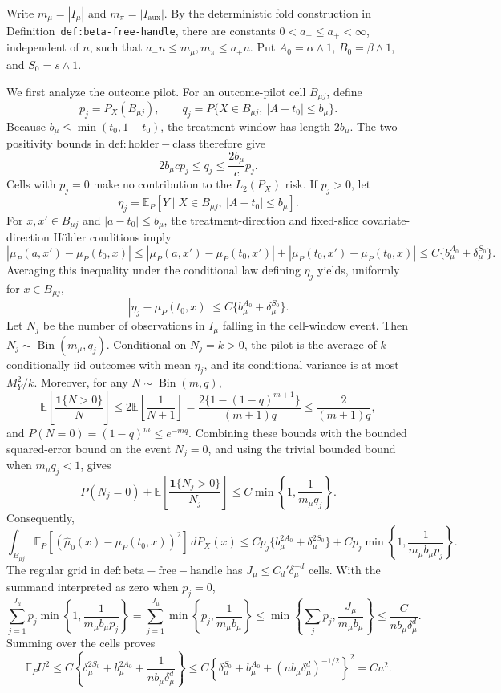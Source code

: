 Write \(m_\mu=|I_\mu|\) and \(m_\pi=|I_{\mathrm{aux}}|\). By the deterministic fold construction in Definition~\texttt{def:beta-free-handle}, there are constants \(0<a_-\le a_+<\infty\), independent of \(n\), such that \(a_-n\le m_\mu,m_\pi\le a_+n\). Put \(A_0=\alpha\wedge1\), \(B_0=\beta\wedge1\), and \(S_0=s\wedge1\).

We first analyze the outcome pilot. For an outcome-pilot cell \(B_{\mu j}\), define
\[
p_j=P_X(B_{\mu j}),\qquad q_j=P\{X\in B_{\mu j},\ |A-t_0|\le b_\mu\}.
\]
Because \(b_\mu\le\min(t_0,1-t_0)\), the treatment window has length \(2b_\mu\). The two positivity bounds in \(\mathrm{def:holder-class}\) therefore give
\[
2b_\mu c p_j\le q_j\le \frac{2b_\mu}{c}p_j.
\]
Cells with \(p_j=0\) make no contribution to the \(L_2(P_X)\) risk. If \(p_j>0\), let
\[
\eta_j=\mathbb E_P[Y\mid X\in B_{\mu j},\ |A-t_0|\le b_\mu].
\]
For \(x,x'\in B_{\mu j}\) and \(|a-t_0|\le b_\mu\), the treatment-direction and fixed-slice covariate-direction Hölder conditions imply
\[
|\mu_P(a,x')-\mu_P(t_0,x)|
\le |\mu_P(a,x')-\mu_P(t_0,x')|
   +|\mu_P(t_0,x')-\mu_P(t_0,x)|
\le C\{b_\mu^{A_0}+\delta_\mu^{S_0}\}.
\]
Averaging this inequality under the conditional law defining \(\eta_j\) yields, uniformly for \(x\in B_{\mu j}\),
\[
|\eta_j-\mu_P(t_0,x)|\le C\{b_\mu^{A_0}+\delta_\mu^{S_0}\}.
\]
Let \(N_j\) be the number of observations in \(I_\mu\) falling in the cell-window event. Then \(N_j\sim\operatorname{Bin}(m_\mu,q_j)\). Conditional on \(N_j=k>0\), the pilot is the average of \(k\) conditionally iid outcomes with mean \(\eta_j\), and its conditional variance is at most \(M_Y^2/k\). Moreover, for any \(N\sim\operatorname{Bin}(m,q)\),
\[
\mathbb E\!\left[\frac{\mathbf 1\{N>0\}}{N}\right]
\le 2\mathbb E\!\left[\frac1{N+1}\right]
=\frac{2\{1-(1-q)^{m+1}\}}{(m+1)q}
\le\frac{2}{(m+1)q},
\]
and \(P(N=0)=(1-q)^m\le e^{-mq}\). Combining these bounds with the bounded squared-error bound on the event \(N_j=0\), and using the trivial bounded bound when \(m_\mu q_j<1\), gives
\[
P(N_j=0)+\mathbb E\!\left[\frac{\mathbf 1\{N_j>0\}}{N_j}\right]
\le C\min\left\{1,\frac1{m_\mu q_j}\right\}.
\]
Consequently,
\[
\int_{B_{\mu j}}\mathbb E_P[(\widehat\mu_0(x)-\mu_P(t_0,x))^2]\,dP_X(x)
\le Cp_j\{b_\mu^{2A_0}+\delta_\mu^{2S_0}\}
 +Cp_j\min\left\{1,\frac1{m_\mu b_\mu p_j}\right\}.
\]
The regular grid in \(\mathrm{def:beta-free-handle}\) has \(J_\mu\le C_d'\delta_\mu^{-d}\) cells. With the summand interpreted as zero when \(p_j=0\),
\[
\sum_{j=1}^{J_\mu}p_j\min\left\{1,\frac1{m_\mu b_\mu p_j}\right\}
=
\sum_{j=1}^{J_\mu}\min\left\{p_j,\frac1{m_\mu b_\mu}\right\}
\le \min\left\{\sum_jp_j,\frac{J_\mu}{m_\mu b_\mu}\right\}
\le \frac{C}{nb_\mu\delta_\mu^d}.
\]
Summing over the cells proves
\[
\mathbb E_PU^2
\le C\left\{\delta_\mu^{2S_0}+b_\mu^{2A_0}+\frac1{nb_\mu\delta_\mu^d}\right\}
\le C\left\{\delta_\mu^{S_0}+b_\mu^{A_0}+(nb_\mu\delta_\mu^d)^{-1/2}\right\}^2
=Cu^2.
\]

